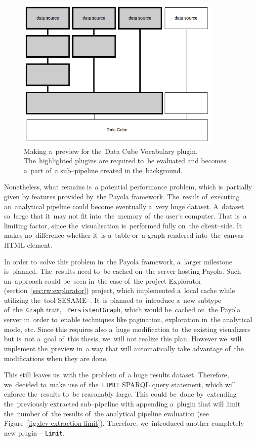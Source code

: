 \begin{figure}
	\centering
	\includegraphics[width=100mm]{img/dcv-extraction.png}
	\caption{Making a~preview for the~Data Cube Vocabulary plugin. The~highlighted
	plugins are required to~be evaluated and becomes a~part of~a sub--pipeline created
	in the~background.}
	\label{fig:dcv-extraction}
\end{figure}

Nonetheless, what remains is~a potential performance problem, which is~partially given 
by features provided by~the Payola framework. The~result of~executing an~analytical pipeline could become eventually a~very huge dataset. A~dataset so~large that it~may not fit into~the~memory of~the user's computer. That is~a 
limiting factor, since the~visualisation is~performed fully on~the client--side. 
It makes no~difference whether it~is a~table or~a graph rendered into~the~canvas HTML element.

In order to~solve this problem in~the Payola framework, a~larger milestone is~planned. The~results need to~be cached on~the server hosting Payola.
Such an~approach could be~seen in~the case of~the project 
Explorator (section~\ref{sec:rw:explorator}) project, which implemented a~local cache
while utilizing the~tool SESAME~\cite{sesame}. It~is planned to~introduce a~new 
subtype of~the~\texttt{Graph} trait, ~\texttt{PersistentGraph}, which would be~cached on~the Payola server in~order to~enable techniques like pagination, 
exploration in~the analytical mode, etc. Since this requires also a~huge 
modification to~the existing visualizers but is~not a~goal of~this thesis, we~will 
not realize this plan. However we~will implement the~preview in~a way that will 
automatically take advantage of~the modifications when they are done.

This still leaves us~with the~problem of~a huge results dataset. Therefore, we~decided to~make use of~the~\texttt{LIMIT} SPARQL query statement, which will 
enforce the~results to~be reasonably large. This could be~done by~extending the~previously extracted sub--pipeline with appending a~plugin that 
will limit the~number of~the results of~the analytical
pipeline evaluation (see Figure~\ref{fig:dcv-extraction-limit}). Therefore, we~introduced another completely new plugin -- \texttt{Limit}.

